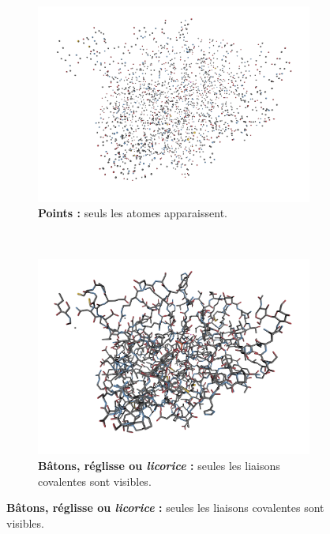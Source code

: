 	
	\newcommand{\subImgW}{0.32\textwidth}
	\begin{figure}[!htbp]
		\begin{subfigure}[t]{\subImgW}
			\centering
			\includegraphics[width=\textwidth]{./figures/ch1/4awn_points}
			\caption[Représentation en points]{\textbf{Points :} seuls les atomes apparaissent.}
			\label{fig:4awn_points}
		\end{subfigure}
		~
		\begin{subfigure}[t]{\subImgW}
			\centering
			\includegraphics[width=\textwidth]{./figures/ch1/4awn_licorice}
			\caption[Représentation en réglisse]{\textbf{Bâtons, réglisse ou \emph{licorice} :} seules les liaisons covalentes sont visibles.}
			\label{fig:4awn_licorice}
		\end{subfigure}

\end{figure}
